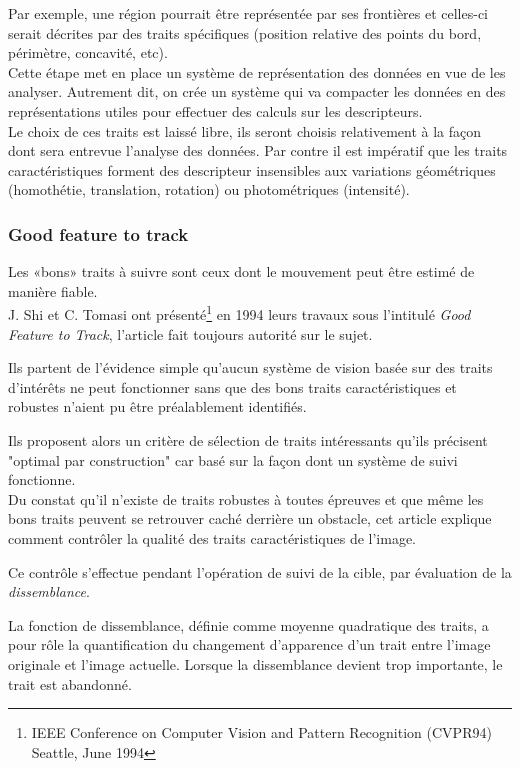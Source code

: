\documentclass[a4paper,12pt]{report}
\begin{document}
Par exemple, une région pourrait être représentée par ses frontières et celles-ci serait décrites par des traits spécifiques (position relative des points du bord, périmètre, concavité, etc).
\\

Cette étape met en place un système de représentation des données en vue de les analyser. Autrement dit, on crée un système qui va compacter les données en des représentations utiles pour effectuer des calculs sur les descripteurs.\\

Le choix de ces traits est laissé libre, ils seront choisis relativement à la façon dont sera entrevue l'analyse des données. Par contre il est impératif que les traits caractéristiques forment des descripteur insensibles aux variations géométriques (homothétie, translation, rotation) ou photométriques (intensité).   
\subsubsection{Good feature to track}
Les «bons» traits à suivre sont ceux dont le mouvement peut être estimé de manière fiable.\\

J. Shi et C. Tomasi ont présenté\footnote{IEEE Conference on Computer Vision and Pattern Recognition (CVPR94) Seattle, June 1994} en 1994 leurs travaux sous l'intitulé \textit{Good Feature to Track}, l'article fait toujours autorité sur le sujet. 

Ils partent de l'évidence simple qu'aucun système de vision basée sur des traits d'intérêts ne peut fonctionner sans que des bons traits caractéristiques et robustes n'aient pu être préalablement identifiés. 

Ils proposent alors un critère de sélection de traits intéressants qu'ils précisent "optimal par construction" car basé sur la façon dont un système de suivi fonctionne.\\

Du constat qu'il n'existe de traits robustes à toutes épreuves et que même les bons traits peuvent se retrouver caché derrière un obstacle, cet article explique comment contrôler la qualité des traits caractéristiques de l'image.

Ce contrôle s'effectue pendant l'opération de suivi de la cible, par évaluation de la \textit{dissemblance}. 

La fonction de dissemblance, définie comme moyenne quadratique des traits, a pour rôle la quantification du changement d'apparence d'un trait entre l'image originale et l'image actuelle. Lorsque la dissemblance devient trop importante, le trait est abandonné.\\
\end{document}
